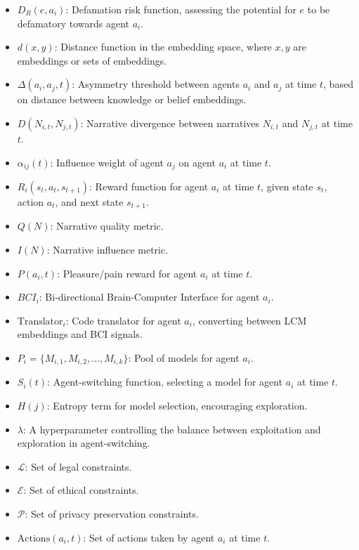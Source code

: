 \documentclass[12pt, a4paper]{article}
\begin{document}
\begin{itemize}
    \item \( D_R(e, a_i) \): Defamation risk function, assessing the potential for \( e \) to be defamatory towards agent \( a_i \).
    \item \( d(x, y) \): Distance function in the embedding space, where \( x, y \) are embeddings or sets of embeddings.
    \item \( \Delta(a_i, a_j, t) \): Asymmetry threshold between agents \( a_i \) and \( a_j \) at time \( t \), based on distance between knowledge or belief embeddings.
    \item \( D(N_{i,t}, N_{j,t}) \): Narrative divergence between narratives \( N_{i,t} \) and \( N_{j,t} \) at time \(t\).
    \item \( \alpha_{ij}(t) \): Influence weight of agent \( a_j \) on agent \( a_i \) at time \( t \).
    \item \( R_i(s_t, a_t, s_{t+1}) \): Reward function for agent \( a_i \) at time \(t\), given state \(s_t\), action \(a_t\), and next state \(s_{t+1}\).
    \item \( Q(N) \): Narrative quality metric.
    \item \( I(N) \): Narrative influence metric.
    \item \( P(a_i, t) \): Pleasure/pain reward for agent \( a_i \) at time \( t \).
    \item \( BCI_i \): Bi-directional Brain-Computer Interface for agent \( a_i \).
    \item \( \text{Translator}_i \): Code translator for agent \( a_i \), converting between LCM embeddings and BCI signals.
    \item \( P_i = \{M_{i,1}, M_{i,2}, \dots, M_{i,k}\} \): Pool of models for agent \( a_i \).
    \item \( S_i(t) \): Agent-switching function, selecting a model for agent \( a_i \) at time \( t \).
    \item \( H(j) \): Entropy term for model selection, encouraging exploration.
    \item \( \lambda \): A hyperparameter controlling the balance between exploitation and exploration in agent-switching.
    \item \( \mathcal{L} \): Set of legal constraints.
    \item \( \mathcal{E} \): Set of ethical constraints.
    \item \( \mathcal{P} \): Set of privacy preservation constraints.
    \item \( \text{Actions}(a_i, t) \): Set of actions taken by agent \( a_i \) at time \( t \).

\end{itemize}
\end{document}
